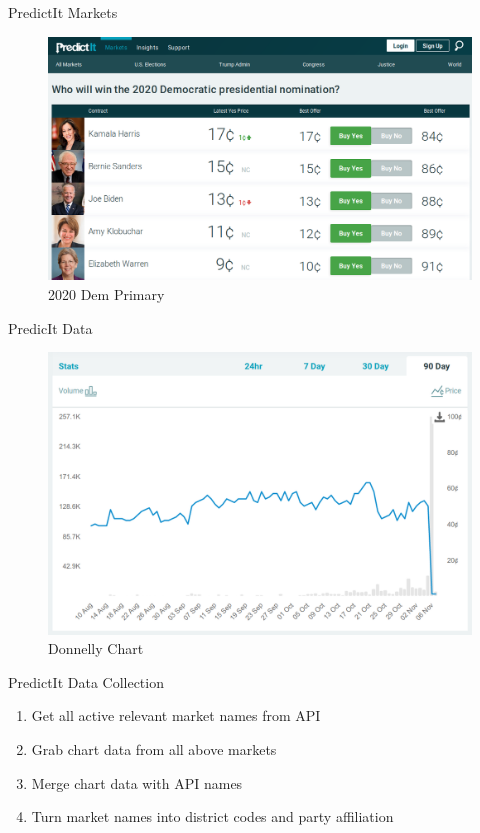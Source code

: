 \documentclass[ignorenonframetext,]{beamer}
\providecommand{\tightlist}{%
  \setlength{\itemsep}{0pt}\setlength{\parskip}{0pt}}
\begin{document}
\begin{frame}{PredictIt Markets}

\begin{figure}
\centering
\includegraphics{2020_dem_market.png}
\caption{2020 Dem Primary}
\end{figure}

\end{frame}

\begin{frame}{PredicIt Data}

\begin{figure}
\centering
\includegraphics{donnelly_graph.png}
\caption{Donnelly Chart}
\end{figure}

\end{frame}

\begin{frame}{PredictIt Data Collection}

\begin{enumerate}
\def\labelenumi{\arabic{enumi}.}
\tightlist
\item
  Get all active relevant market names from API
\item
  Grab chart data from all above markets
\item
  Merge chart data with API names
\item
  Turn market names into district codes and party affiliation
\end{enumerate}

\end{frame}
\end{document}
